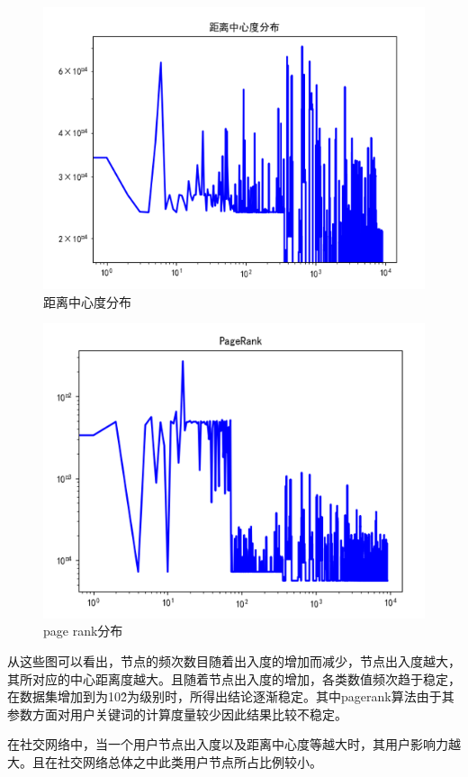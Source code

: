 \begin{figure}[h]
	\centering
	\includegraphics[scale=0.5]{figures/13.png}
	\caption{距离中心度分布}
	\label{fig:1}
\end{figure}

\begin{figure}[h]
	\centering
	\includegraphics[scale=0.5]{figures/14.png}
	\caption{page rank分布}
	\label{fig:1}
\end{figure}

从这些图可以看出，节点的频次数目随着出入度的增加而减少，节点出入度越大，其所对应的中心距离度越大。且随着节点出入度的增加，各类数值频次趋于稳定，在数据集增加到为10\^2为级别时，所得出结论逐渐稳定。其中pagerank算法由于其参数方面对用户关键词的计算度量较少因此结果比较不稳定。
\par
在社交网络中，当一个用户节点出入度以及距离中心度等越大时，其用户影响力越大。且在社交网络总体之中此类用户节点所占比例较小。 














